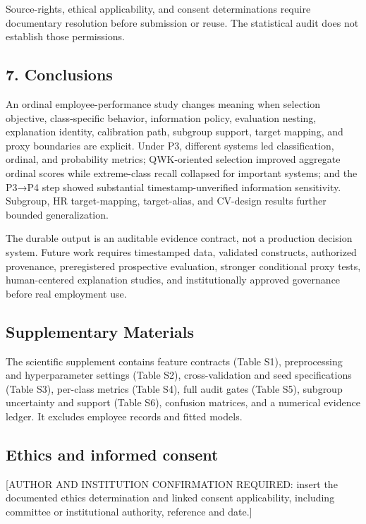 \documentclass[
  a4paper,
  review]{elsarticle}
\begin{document}
Source-rights, ethical applicability, and consent determinations require
documentary resolution before submission or reuse. The statistical audit
does not establish those permissions.

\subsection{7. Conclusions}\label{conclusions}

An ordinal employee-performance study changes meaning when selection
objective, class-specific behavior, information policy, evaluation
nesting, explanation identity, calibration path, subgroup support,
target mapping, and proxy boundaries are explicit. Under P3, different
systems led classification, ordinal, and probability metrics;
QWK-oriented selection improved aggregate ordinal scores while
extreme-class recall collapsed for important systems; and the P3→P4 step
showed substantial timestamp-unverified information sensitivity.
Subgroup, HR target-mapping, target-alias, and CV-design results further
bounded generalization.

The durable output is an auditable evidence contract, not a production
decision system. Future work requires timestamped data, validated
constructs, authorized provenance, preregistered prospective evaluation,
stronger conditional proxy tests, human-centered explanation studies,
and institutionally approved governance before real employment use.

\subsection{Supplementary Materials}\label{supplementary-materials}

The scientific supplement contains feature contracts (Table S1),
preprocessing and hyperparameter settings (Table S2), cross-validation
and seed specifications (Table S3), per-class metrics (Table S4), full
audit gates (Table S5), subgroup uncertainty and support (Table S6),
confusion matrices, and a numerical evidence ledger. It excludes
employee records and fitted models.

\subsection{Ethics and informed
consent}\label{ethics-and-informed-consent}

{[}AUTHOR AND INSTITUTION CONFIRMATION REQUIRED: insert the documented
ethics determination and linked consent applicability, including
committee or institutional authority, reference and date.{]}
\end{document}

